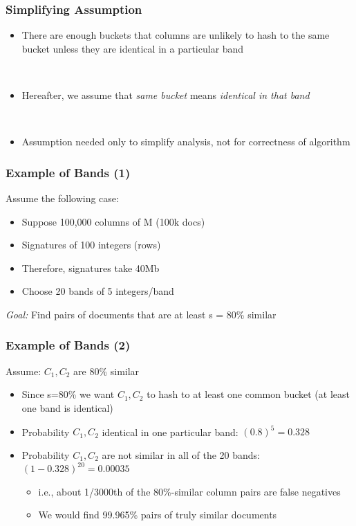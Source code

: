\documentclass[svgnames]{beamer}
\begin{document}
  
\begin{frame} \frametitle{Simplifying Assumption}
\begin{itemize}
\item There are enough buckets that columns are unlikely to hash to the same bucket unless they are identical in a particular band

~\\

\item Hereafter, we assume that \emph{same bucket} means \emph{identical in that band}

~\\

\item Assumption needed only to simplify analysis, not for correctness of algorithm
\end{itemize}
\end{frame}

  
\begin{frame} \frametitle{Example of Bands (1)}
\begin{block}{Assume the following case:}
\begin{itemize}
\item Suppose 100,000 columns of M (100k docs)
\item Signatures of 100 integers (rows)
\item Therefore, signatures take 40Mb
\item Choose 20 bands of 5 integers/band
\end{itemize}
\end{block}
\emph{Goal:} Find pairs of documents that are at least s = 80\% similar
\end{frame}

  
\begin{frame} \frametitle{Example of Bands (2)}

\begin{block}{Assume: $C_1, C_2$ are 80\% similar}
\begin{itemize}
\item Since s=80\% we want $C_1, C_2$ to hash to at least one common bucket (at least one band is identical)
\item Probability $C_1, C_2$ identical in one particular band: $(0.8)^5 = 0.328$
\item Probability $C_1, C_2$ are not similar in all of the 20 bands: $(1-0.328)^{20} = 0.00035$
  \begin{itemize}
  \item i.e., about 1/3000th of the 80\%-similar column pairs are false negatives
  \item We would find 99.965\% pairs of truly similar documents
  \end{itemize}
\end{itemize}
\end{block}
\end{frame}
\end{document}
